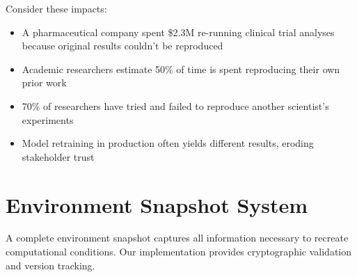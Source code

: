 Consider these impacts:

\begin{itemize}
    \item A pharmaceutical company spent \$2.3M re-running clinical trial analyses because original results couldn't be reproduced
    \item Academic researchers estimate 50\% of time is spent reproducing their own prior work
    \item 70\% of researchers have tried and failed to reproduce another scientist's experiments
    \item Model retraining in production often yields different results, eroding stakeholder trust
\end{itemize}

\section{Environment Snapshot System}

A complete environment snapshot captures all information necessary to recreate computational conditions. Our implementation provides cryptographic validation and version tracking.

